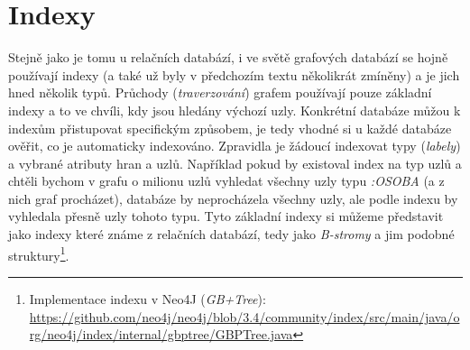 \section{Indexy}
\label{sec:gdb-indexy}
Stejně jako je tomu u relačních databází, i ve světě grafových databází se hojně používají indexy (a také už byly v předchozím textu několikrát zmíněny) a je jich hned několik typů. Průchody (\textit{traverzování}) grafem používají pouze základní indexy a to ve chvíli, kdy jsou hledány výchozí uzly. Konkrétní databáze můžou k indexům přistupovat specifickým způsobem, je tedy vhodné si u každé databáze ověřit, co je automaticky indexováno. Zpravidla je žádoucí indexovat typy (\textit{labely}) a vybrané atributy hran a uzlů. Například pokud by existoval index na typ uzlů a chtěli bychom v grafu o milionu uzlů vyhledat všechny uzly typu \textit{:OSOBA} (a z nich graf procházet), databáze by neprocházela všechny uzly, ale podle indexu by vyhledala přesně uzly tohoto typu. Tyto základní indexy si můžeme představit jako indexy které známe z relačních databází, tedy jako \textit{B-stromy} a jim podobné struktury\footnote{Implementace indexu v Neo4J (\textit{GB+Tree}): \url{https://github.com/neo4j/neo4j/blob/3.4/community/index/src/main/java/org/neo4j/index/internal/gbptree/GBPTree.java}}.

